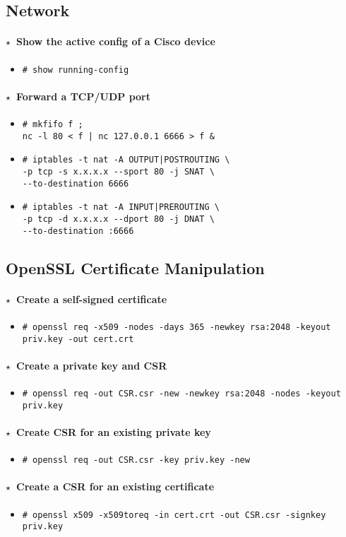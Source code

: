 \documentclass[10pt,landscape]{article}
\newcommand{\os}[1]{\texttt{\footnotesize{#1}}}
\newcommand{\unix}{\os{U}}
\newcommand{\linux}{\os{L}}
\newenvironment{action}[1]
  {\paragraph{$\star$~#1}\begin{itemize}[leftmargin=1cm]}
  {\end{itemize}}
\newcommand{\cmd}[2]{\item[#1] {\small\tt\# #2}}
\newcommand{\app}[1]{\footnotesize\sc{#1}}
\begin{document}
\begin{multicols*}{3}
\subsection*{Network}

\newcommand{\cisco}{\app{cisco}}

\begin{action}{Show the active config of a Cisco device}
\cmd{\cisco}{show running-config}
\end{action}

\begin{action}{Forward a TCP/UDP port}
\cmd{\unix}{mkfifo f ;\\
nc -l 80 < f | nc 127.0.0.1 6666 > f \&}
\cmd{\linux}{iptables -t nat -A OUTPUT|POSTROUTING \textbackslash\\
  -p tcp -s x.x.x.x -{}-sport 80 -j SNAT \textbackslash\\
  -{}-to-destination 6666}
\cmd{\linux}{iptables -t nat -A INPUT|PREROUTING \textbackslash\\
  -p tcp -d x.x.x.x -{}-dport 80 -j DNAT \textbackslash\\
  -{}-to-destination :6666}
\end{action}

\subsection*{OpenSSL Certificate Manipulation}

\begin{action}{Create a self-signed certificate}
    \cmd{\unix}{openssl req -x509 -nodes -days 365 -newkey rsa:2048 -keyout
    priv.key -out cert.crt}
\end{action}

\begin{action}{Create a private key and CSR}
    \cmd{\unix}{openssl req -out CSR.csr -new -newkey rsa:2048 -nodes -keyout
    priv.key}
\end{action}

\begin{action}{Create CSR for an existing private key}
    \cmd{\unix}{openssl req -out CSR.csr -key priv.key -new}
\end{action}

\begin{action}{Create a CSR for an existing certificate}
    \cmd{\unix}{openssl x509 -x509toreq -in cert.crt -out CSR.csr
    -signkey priv.key}
\end{action}


\end{multicols*}
\end{document}
